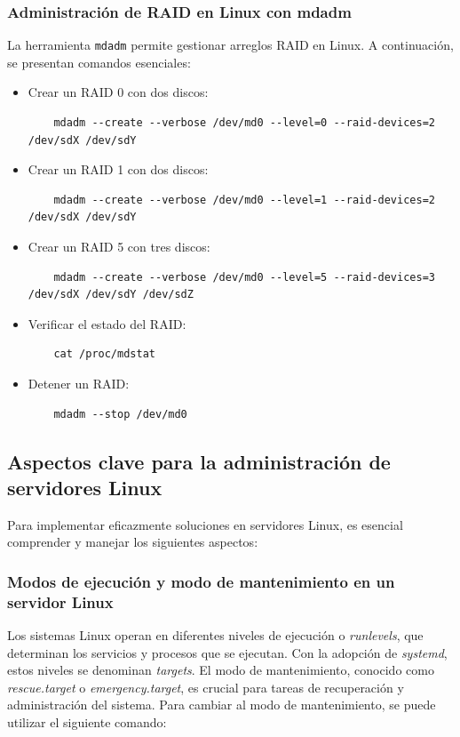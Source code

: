 \subsubsection{Administración de RAID en Linux con mdadm}

La herramienta \texttt{mdadm} permite gestionar arreglos RAID en Linux. A continuación, se presentan comandos esenciales:

\begin{itemize}
  \item Crear un RAID 0 con dos discos:
    \begin{lstlisting}
    mdadm --create --verbose /dev/md0 --level=0 --raid-devices=2 /dev/sdX /dev/sdY
    \end{lstlisting}
  \item Crear un RAID 1 con dos discos:
    \begin{lstlisting}
    mdadm --create --verbose /dev/md0 --level=1 --raid-devices=2 /dev/sdX /dev/sdY
    \end{lstlisting}
  \item Crear un RAID 5 con tres discos:
    \begin{lstlisting}
    mdadm --create --verbose /dev/md0 --level=5 --raid-devices=3 /dev/sdX /dev/sdY /dev/sdZ
    \end{lstlisting}
  \item Verificar el estado del RAID:
    \begin{lstlisting}
    cat /proc/mdstat
    \end{lstlisting}
  \item Detener un RAID:
    \begin{lstlisting}
    mdadm --stop /dev/md0
    \end{lstlisting}
\end{itemize}

\subsection{Aspectos clave para la administración de servidores Linux}

Para implementar eficazmente soluciones en servidores Linux, es esencial comprender y manejar los siguientes aspectos:

\subsubsection{Modos de ejecución y modo de mantenimiento en un servidor Linux}

Los sistemas Linux operan en diferentes niveles de ejecución o \textit{runlevels}, que determinan los servicios y procesos que se ejecutan. Con la adopción de \textit{systemd}, estos niveles se denominan \textit{targets}. El modo de mantenimiento, conocido como \textit{rescue.target} o \textit{emergency.target}, es crucial para tareas de recuperación y administración del sistema. Para cambiar al modo de mantenimiento, se puede utilizar el siguiente comando:

